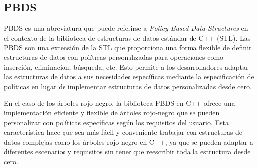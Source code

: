 \subsection{PBDS}

PBDS es una abreviatura que puede referirse a \emph{Policy-Based Data Structures} en el contexto de la biblioteca de estructuras de datos estándar de C++ (STL). Las PBDS son una extensión de la STL que proporciona una forma flexible de definir estructuras de datos con políticas personalizadas para operaciones como inserción, eliminación, búsqueda, etc. Esto permite a los desarrolladores adaptar las estructuras de datos a sus necesidades específicas mediante la especificación de políticas en lugar de implementar estructuras de datos personalizadas desde cero.

En el caso de los árboles rojo-negro, la biblioteca PBDS en C++ ofrece una implementación eficiente y flexible de árboles rojo-negro que se pueden personalizar con políticas específicas según los requisitos del usuario. Esta característica hace que sea más fácil y conveniente trabajar con estructuras de datos complejas como los árboles rojo-negro en C++, ya que se pueden adaptar a diferentes escenarios y requisitos sin tener que reescribir toda la estructura desde cero.

